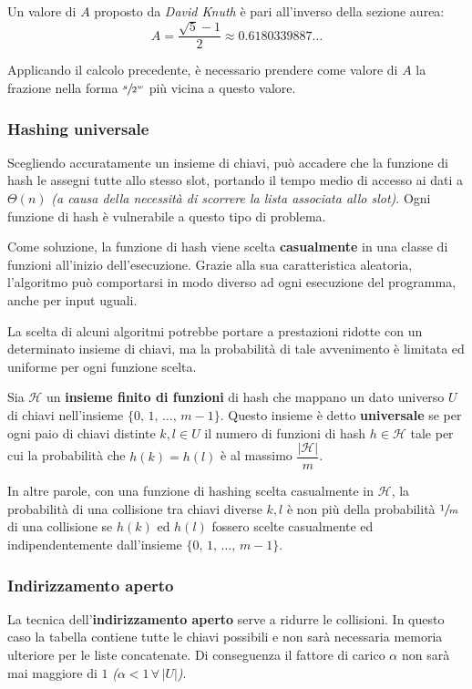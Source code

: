 \documentclass[italian, 10pt]{article}
\begin{document}
Un valore di \(A\) proposto da \textit{David Knuth} è pari all'inverso della sezione aurea:
\[ A = \dfrac{\sqrt{5} - 1}{2} \approx 0.6180339887 \ldots \]

Applicando il calcolo precedente, è necessario prendere come valore di \(A\) la frazione nella forma \(\sfrac{s}{2^w}\) più vicina a questo valore.

\subsubsection{Hashing universale}

Scegliendo accuratamente un insieme di chiavi, può accadere che la funzione di hash le assegni tutte allo stesso slot, portando il tempo medio di accesso ai dati a \(\Theta(n)\) \textit{(a causa della necessità di scorrere la lista associata allo slot)}.
Ogni funzione di hash è vulnerabile a questo tipo di problema.

Come soluzione, la funzione di hash viene scelta \textbf{casualmente} in una classe di funzioni all'inizio dell'esecuzione.
Grazie alla sua caratteristica aleatoria, l'algoritmo può comportarsi in modo diverso ad ogni esecuzione del programma, anche per input uguali.

La scelta di alcuni algoritmi potrebbe portare a prestazioni ridotte con un determinato insieme di chiavi, ma la probabilità di tale avvenimento è limitata ed uniforme per ogni funzione scelta.

\bigskip
Sia \(\mathscr{H}\) un \textbf{insieme finito di funzioni} di hash che mappano un dato universo \(U\) di chiavi nell'insieme \(\{0,\, 1, \, \ldots, \, m-1\}\).
Questo insieme è detto \textbf{universale} se per ogni paio di chiavi distinte \(k, l \in U\) il numero di funzioni di hash \(h \in \mathscr{H}\) tale per cui la probabilità che \(h(k) = h(l)\) è al massimo \(\dfrac{|\mathscr{H}|}{m}\).

\bigskip
In altre parole, con una funzione di hashing scelta casualmente in \(\mathscr{H}\), la probabilità di una collisione tra chiavi diverse \(k, l\) è non più della probabilità \(\sfrac{1}{m}\) di una collisione se \(h(k)\) ed \(h(l)\) fossero scelte casualmente ed indipendentemente dall'insieme \(\{0, \, 1, \, \ldots, \, m-1\}\).

\subsubsection{Indirizzamento aperto}
La tecnica dell'\textbf{indirizzamento aperto} serve a ridurre le collisioni.
In questo caso la tabella contiene tutte le chiavi possibili e non sarà necessaria memoria ulteriore per le liste concatenate.
Di conseguenza il fattore di carico \(\alpha\) non sarà mai maggiore di \(1\) \textit{(\(\alpha < 1 \, \forall \, |U|\))}.
\end{document}
